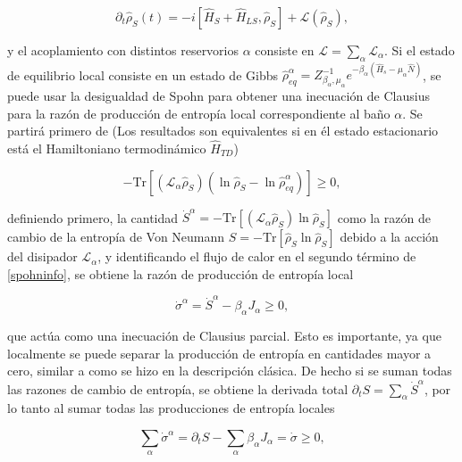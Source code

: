 \begin{equation*}
    \partial_{t}\hat{\rho}_{S}(t) = - i[\hat{H}_{S} + \hat{H}_{LS},\hat{\rho}_{S}] + \mathcal{L}(\hat{\rho}_{S}),
\end{equation*}

y el acoplamiento con distintos reservorios $\alpha$ consiste en $\mathcal{L} = \sum_{\alpha}\mathcal{L}_{\alpha}$. Si el estado de equilibrio local consiste en un estado de Gibbs $\hat{\rho}_{eq}^{\alpha} = Z_{\beta_{\alpha},\mu_{\alpha}}^{-1}e^{-\beta_{\alpha}(\hat{H}_{s} - \mu_{\alpha}\hat{N})}$, se puede usar la desigualdad de Spohn \cite{spohn1978entropy} para  obtener una inecuación de Clausius para la razón de producción de entropía local correspondiente al baño $\alpha$. Se partirá primero de (Los resultados son equivalentes si en él estado estacionario está el Hamiltoniano termodinámico $\hat{H}_{TD}$)

\begin{equation}
    - \text{Tr}[ (\mathcal{L}_{\alpha} \hat{\rho}_{S})(\ln \hat{\rho}_{S} - \ln \hat{\rho}^{\alpha}_{eq} )  ] \geq 0,
\label{spohninfo}
\end{equation}

definiendo primero, la cantidad $\dot{S}^{\alpha} = - \text{Tr}[(\mathcal{L}_{\alpha}\hat{\rho}_{S}) \ln \hat{\rho}_{S} ]$ como la razón de cambio de la entropía de Von Neumann $S = - \text{Tr}[\hat{\rho}_{S} \ln \hat{\rho}_{S} ]$ debido a la acción del disipador $\mathcal{L}_{\alpha}$, y identificando el flujo de calor en el segundo término de \ref{spohninfo}, se obtiene la razón de producción de entropía local

\begin{equation}
    \dot{\sigma}^{\alpha} = \dot{S}^{\alpha} - \beta_{\alpha} J_{\alpha} \geq 0,
\label{sec4:localentropy}
\end{equation}

que actúa como una inecuación de Clausius parcial. Esto es importante, ya que localmente se puede separar la producción de entropía en cantidades mayor a cero, similar a como se hizo en la descripción clásica. De hecho si se suman todas las razones de cambio de entropía, se obtiene la derivada total $\partial_{t} S = \sum_{\alpha} \dot{S}^{\alpha}$, por lo tanto al sumar todas las producciones de entropía locales

\begin{equation*}
    \sum_{\alpha}\dot{\sigma}^{\alpha} = \partial_{t}S - \sum_{\alpha}\beta_{\alpha}J_{\alpha} = \dot{\sigma} \geq 0,
\end{equation*}

